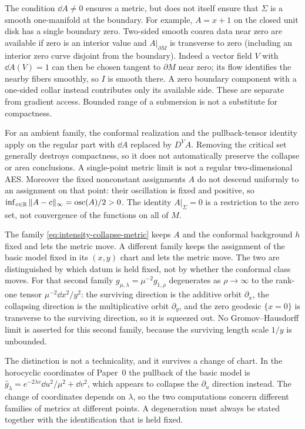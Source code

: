 \begin{remark}
\label{rem:intensity-collapse-hypotheses}
The condition $\dd A\ne0$ ensures a metric, but does not itself ensure that
$\Sigma$ is a smooth one-manifold at the boundary.  For example, $A=x+1$ on
the closed unit disk has a single boundary zero.  Two-sided smooth coarea data
near zero are available if zero is an interior value and
$A|_{\partial M}$ is transverse to zero (including an interior zero curve
disjoint from the boundary).  Indeed a vector field $V$ with $\dd A(V)=1$
can then be chosen tangent to $\partial M$ near zero; its flow identifies the
nearby fibers smoothly, so $I$ is smooth there.  A zero boundary component with
a one-sided collar instead contributes only its available side.  These are separate from gradient
access.  Bounded range of a submersion is not a substitute for compactness.

For an ambient family, the conformal realization and the pullback-tensor identity
apply on the regular part with $\dd A$ replaced by $D^VA$.  Removing the critical
set generally destroys compactness, so it does not automatically preserve the
collapse or area conclusions.  A single-point metric limit is not a regular
two-dimensional AES.  Moreover the fixed nonconstant assignments $A$ do not
descend uniformly to an assignment on that point: their oscillation is fixed
and positive, so $\inf_{c\in\mathbb{R}}\|A-c\|_\infty=\operatorname{osc}(A)/2>0$.  The identity $A|_\Sigma=0$ is a restriction to the zero
set, not convergence of the functions on all of $M$.
\end{remark}

\begin{warning}
\label{warn:intensity-collapse-two-readings}
The family \eqref{eq:intensity-collapse-metric} keeps $A$ and the conformal
background $h$ fixed and lets the metric move.  A different family keeps the
assignment of the basic model fixed in its $(x,y)$ chart and lets the metric move.
The two are distinguished by which datum is held fixed, not by whether the
conformal class moves.  For that second family $g_{\mu,\lambda}=\mu^{-2}g_{1,\rho}$ degenerates as
$\rho\to\infty$ to the rank-one tensor $\mu^{-2}\dd x^2/y^2$: the surviving
direction is the additive orbit $\partial_x$, the collapsing direction is the
multiplicative orbit $\partial_y$, and the zero geodesic $\{x=0\}$ is transverse to
the surviving direction, so it is squeezed out.  No Gromov--Hausdorff limit is
asserted for this second family, because the surviving length scale $1/y$ is
unbounded.

The distinction is not a technicality, and it survives a change of chart.  In the
horocyclic coordinates of Paper~0 the pullback of the basic model is
$\widehat g_\lambda=e^{-2\lambda v}\dd u^2/\mu^2+\dd v^2$, which appears to collapse
the $\partial_u$ direction instead.  The change of coordinates depends on
$\lambda$, so the two computations concern different families of metrics at
different points.  A degeneration must always be stated together with the
identification that is held fixed.
\end{warning}

